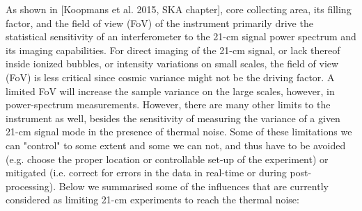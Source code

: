 As shown in [Koopmans et al. 2015, SKA chapter], core collecting area, its filling factor, and the field of view (FoV) of the instrument primarily drive the statistical sensitivity of an interferometer to the 21-cm signal power spectrum and its imaging capabilities. For direct imaging of the 21-cm signal, or lack thereof inside ionized bubbles, or intensity variations on small scales, the field of view (FoV) is less critical since cosmic variance might not be the driving factor. A limited FoV will increase the sample variance on the large scales, however, in power-spectrum measurements. However, there are many other limits to the instrument as well, besides the sensitivity of measuring the variance of a given 21-cm signal mode in the presence of thermal noise. Some of these limitations we can "control" to some extent and some we can not, and thus have to be avoided (e.g. choose the proper location or controllable set-up of the experiment) or mitigated (i.e. correct for errors in the data in real-time or during post-processing).
%
Below we summarised some of the influences that are currently considered as limiting 21-cm experiments to reach the thermal noise:
%

